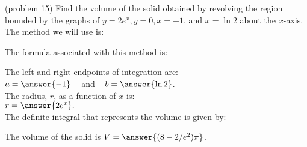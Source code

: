 \documentclass[handout]{ximera}
\begin{document}
\begin{problem}(problem 15)
Find the volume of the solid obtained by revolving the region bounded by the graphs of $y = 2e^x, y = 0, x = -1$, and $x = \ln 2$ about the $x$-axis.\\
The method we will use is:
\begin{multipleChoice}
\end{multipleChoice}

The formula associated with this method is:
\begin{multipleChoice}
\end{multipleChoice}

The left and right endpoints of integration are:\\
$a = \answer{-1}\;\;\;$ and $\;\;\; b = \answer{\ln 2}$.\\
The radius, $r$, as a function of $x$ is:\\
$r = \answer{2e^x}.$\\

The definite integral that represents the volume is given by:\\
\begin{multipleChoice}
\end{multipleChoice}

The volume of the solid is $V = \answer{(8-2/{e^2})\pi}$.

\end{problem}
\end{document}
